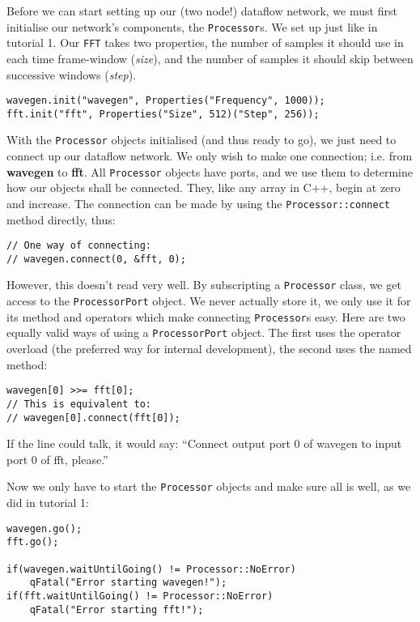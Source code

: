 Before we can start setting up our (two node!) dataflow network, we must first initialise our network's components, the \texttt{Processor}s. We set up just like in tutorial 1. Our \texttt{FFT} takes two properties, the number of samples it should use in each time frame-window (\textit{size}), and the number of samples it should skip between successive windows (\textit{step}).

\begin{verbatim}
wavegen.init("wavegen", Properties("Frequency", 1000));
fft.init("fft", Properties("Size", 512)("Step", 256));
\end{verbatim}

With the \texttt{Processor} objects initialised (and thus ready to go), we just need to connect up our dataflow network. We only wish to make one connection; i.e. from \textbf{wavegen} to \textbf{fft}. All \texttt{Processor} objects have ports, and we use them to determine how our objects shall be connected. They, like any array in C++, begin at zero and increase. The connection can be made by using the \texttt{Processor::connect} method directly, thus:

\begin{verbatim}
// One way of connecting:
// wavegen.connect(0, &fft, 0);
\end{verbatim}

However, this doesn't read very well. By subscripting a \texttt{Processor} class, we get access to the \texttt{ProcessorPort} object. We never actually store it, we only use it for its method and operators which make connecting \texttt{Processor}s easy. Here are two equally valid ways of using a \texttt{ProcessorPort} object. The first uses the operator overload (the preferred way for internal development), the second uses the named method:

\begin{verbatim}
wavegen[0] >>= fft[0];
// This is equivalent to:
// wavegen[0].connect(fft[0]);
\end{verbatim}

If the line could talk, it would say: ``Connect output port 0 of wavegen to input port 0 of fft, please.''

Now we only have to start the \texttt{Processor} objects and make sure all is well, as we did in tutorial 1:

\begin{verbatim}
wavegen.go();
fft.go();

if(wavegen.waitUntilGoing() != Processor::NoError) 
    qFatal("Error starting wavegen!");
if(fft.waitUntilGoing() != Processor::NoError)
    qFatal("Error starting fft!");
\end{verbatim}

